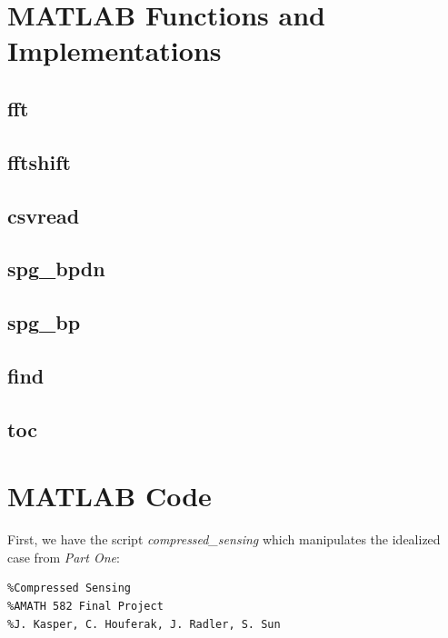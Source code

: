 \documentclass[11pt]{article}
\begin{document}
\pagebreak

\begin{appendices}

\section{MATLAB Functions and Implementations}

\subsection*{fft}

\subsection*{fftshift}

\subsection*{csvread}

\subsection*{spg\_bpdn}

\subsection*{spg\_bp}

\subsection*{find}

\subsection*{toc}

\section{MATLAB Code}
First, we have the script \emph{compressed\_sensing} which manipulates the idealized case from \emph{Part One}:\\
\begin{verbatim}
%Compressed Sensing
%AMATH 582 Final Project
%J. Kasper, C. Houferak, J. Radler, S. Sun


\end{verbatim}
\end{appendices}
\end{document}
